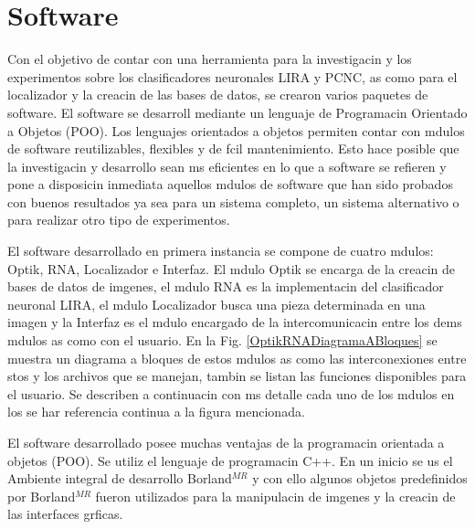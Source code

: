 \chapter{Software}
Con el objetivo de contar con una herramienta para la investigacin y
los experimentos sobre los clasificadores neuronales LIRA y PCNC, as como para el localizador y la creacin de las bases de datos, se crearon varios paquetes de software. El software se desarroll mediante un lenguaje de Programacin Orientado a Objetos (POO). Los lenguajes orientados a
objetos permiten contar con mdulos de software reutilizables,
flexibles y de fcil mantenimiento. Esto
hace posible que la investigacin y desarrollo sean ms eficientes en lo que a software se refieren
y pone a disposicin inmediata aquellos mdulos de software que han
sido probados con buenos resultados ya sea para un sistema completo,
un sistema alternativo o para realizar otro tipo de experimentos.

El software desarrollado en primera instancia se compone de cuatro mdulos: Optik, RNA,
Localizador e Interfaz. El mdulo Optik se encarga de la creacin de
bases de datos de imgenes, el mdulo RNA es la implementacin del
clasificador neuronal LIRA, el mdulo Localizador busca una pieza
determinada en una imagen y la Interfaz es el mdulo encargado de la
intercomunicacin entre los dems mdulos as como con el usuario. En
la Fig. \ref{OptikRNADiagramaABloques} se muestra un diagrama a bloques de estos mdulos as como
las interconexiones entre stos y los archivos que se manejan, tambin
se listan las funciones disponibles para el usuario. Se describen a
continuacin con ms detalle cada uno de los mdulos en los se har
referencia continua a la figura mencionada.

\begin{figure}[h]
\begin{center}
\end{center}
\end{figure}

El software desarrollado posee muchas ventajas de la programacin orientada a objetos (POO). Se utiliz el lenguaje de programacin C++. En un inicio se us el Ambiente integral de desarrollo Borland$^{MR}$ y con ello algunos objetos predefinidos por Borland$^{MR}$ fueron utilizados para la manipulacin de imgenes y la creacin de las interfaces grficas.

